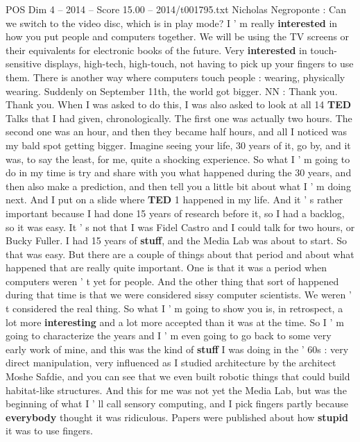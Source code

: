\begin{textsample}{POS Dim 4 – 2014 – Score 15.00 – 2014/t001795.txt}  \label{ex:f4_pos_070}
Nicholas Negroponte : Can we switch to the video disc, which is in play mode?
I ' m really \textbf{interested} in how you put people and computers together.
We will be using the TV screens or their equivalents for electronic books of the future.
Very \textbf{interested} in touch-sensitive displays, high-tech, high-touch, not having to pick up your fingers to use them.
There is another way where computers touch people : wearing, physically wearing.
Suddenly on September 11th, the world got bigger.
NN : Thank you.
Thank you.
When I was asked to do this, I was also asked to look at all 14 \textbf{TED} Talks that I had given, chronologically.
The first one was actually two hours.
The second one was an hour, and then they became half hours, and all I noticed was my bald spot getting bigger.
Imagine seeing your life, 30 years of it, go by, and it was, to say the least, for me, quite a shocking experience.
So what I ' m going to do in my time is try and share with you what happened during the 30 years, and then also make a prediction, and then tell you a little bit about what I ' m doing next.
And I put on a slide where \textbf{TED} 1 happened in my life.
And it ' s rather important because I had done 15 years of research before it, so I had a backlog, so it was easy.
It ' s not that I was Fidel Castro and I could talk for two hours, or Bucky Fuller.
I had 15 years of \textbf{stuff}, and the Media Lab was about to start.
So that was easy.
But there are a couple of things about that period and about what happened that are really quite important.
One is that it was a period when computers weren ' t yet for people.
And the other thing that sort of happened during that time is that we were considered sissy computer scientists.
We weren ' t considered the real thing.
So what I ' m going to show you is, in retrospect, a lot more \textbf{interesting} and a lot more accepted than it was at the time.
So I ' m going to characterize the years and I ' m even going to go back to some very early work of mine, and this was the kind of \textbf{stuff} I was doing in the ' 60s : very direct manipulation, very influenced as I studied architecture by the architect Moshe Safdie, and you can see that we even built robotic things that could build habitat-like structures.
And this for me was not yet the Media Lab, but was the beginning of what I ' ll call sensory computing, and I pick fingers partly because \textbf{everybody} thought it was ridiculous.
Papers were published about how \textbf{stupid} it was to use fingers.

\end{textsample}
